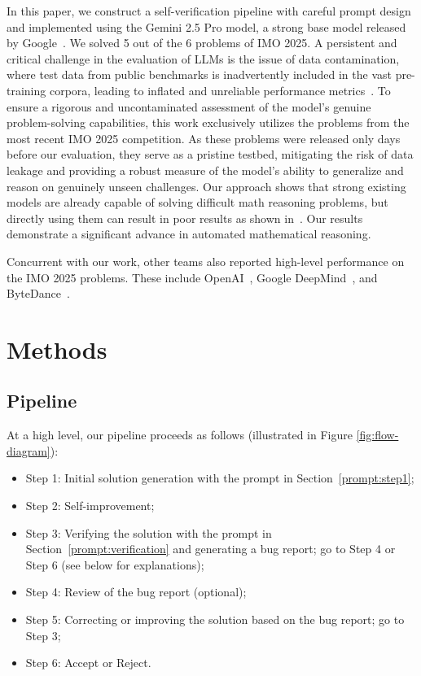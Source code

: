 In this paper, we construct a self-verification pipeline with careful prompt design and implemented using the Gemini 2.5 Pro model, a strong base model released by Google~\cite{gemini2025blog}. We solved 5 out of the 6 problems of IMO 2025. A persistent and critical challenge in the evaluation of LLMs is the issue of data contamination, where test data from public benchmarks is inadvertently included in the vast pre-training corpora, leading to inflated and unreliable performance metrics~\cite{zhou2024dont}. To ensure a rigorous and uncontaminated assessment of the model’s genuine problem-solving capabilities, this work exclusively utilizes the problems from the most recent IMO 2025 competition. As these problems were released only days before our evaluation, they serve as a pristine testbed, mitigating the risk of data leakage and providing a robust measure of the model’s ability to generalize and reason on genuinely unseen challenges. Our approach shows that strong existing models are already capable of solving difficult math reasoning problems, but directly using them can result in poor results as shown in~\cite{matharena2025}. Our results demonstrate a significant advance in automated mathematical reasoning.

Concurrent with our work, other teams also reported high-level performance on the IMO 2025 problems. These include OpenAI~\cite{wei2025openai}, Google DeepMind~\cite{Deepmind}, and ByteDance~\cite{bytedance2025seed}.

\section{Methods}

\subsection{Pipeline}

At a high level, our pipeline proceeds as follows (illustrated in Figure \ref{fig:flow-diagram}):

\begin{itemize}
    \item Step 1: Initial solution generation with the prompt in Section~\ref{prompt:step1};
    \item Step 2: Self-improvement;
    \item Step 3: Verifying the solution with the prompt in Section~\ref{prompt:verification} and generating a bug report; go to Step 4 or Step 6 (see below for explanations);
    \item Step 4: Review of the bug report (optional);
    \item Step 5: Correcting or improving the solution based on the bug report; go to Step 3;
    \item Step 6: Accept or Reject.
\end{itemize}

